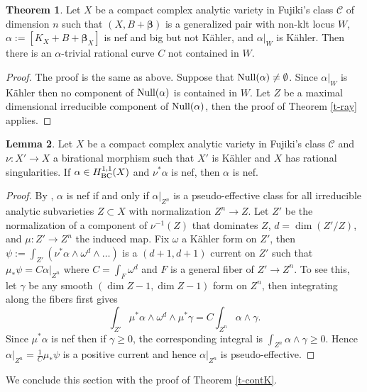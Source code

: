 \documentclass[11pt]{amsart}
\numberwithin{equation}{section}
\def\bbeta{\boldsymbol{\beta}}
\def\dim{\operatorname{dim}}
\newcommand\Q{{\mathbb{Q}}}
\theoremstyle{definition}
\theoremstyle{definition}
\newtheorem{theorem}{Theorem}[section]
\newtheorem{lemma}[theorem]{Lemma}
\newtheorem{corollary}[theorem]{Corollary}
\theoremstyle{definition}
\begin{document}
\begin{theorem} 
\label{t-raynklt} 
Let $X$ be a compact complex analytic variety in Fujiki's class $\mathcal C$ of dimension $n$ such that $(X,B+\bbeta)$ is a generalized pair with non-klt locus $W$, $\alpha:=[K_X+B+\bbeta _X]$ is nef and big but not K\"ahler, and $\alpha |_{W}$ is K\"ahler. Then there is an $\alpha $-trivial  rational curve $C$ not contained in $W$.
\end{theorem}
\begin{proof} The proof is the same as above. Suppose that ${\rm Null}(\alpha)\ne \emptyset$. Since $\alpha |_{W}$ is K\"ahler then no component of ${\rm Null}(\alpha)$ is contained in $ W$. Let $Z$ be a maximal dimensional irreducible component of ${\rm Null}(\alpha)$, then the proof of Theorem \ref{t-ray} applies. 
\end{proof}
\begin{lemma}\label{l-nefpb} Let $X$ be a  compact complex analytic variety in Fujiki's class $\mathcal C$ and $\nu :X'\to X$ a birational morphism such that $X'$ is K\"ahler and $X$ has rational singularities. If  $\alpha \in H^{1,1}_{\rm BC}(X)$ and $\nu ^*\alpha$ is nef, then $\alpha$ is nef. \end{lemma} 
\begin{proof} By \cite[Remark 2.37]{DHP24}, $\alpha$ is nef if and only if $\alpha|_{Z^n}$ is a pseudo-effective class for all irreducible analytic
subvarieties $Z \subset X$ with normalization $Z^n\to Z$.
Let $Z'$ be the normalization of a component of $\nu^{-1}(Z)$ that dominates $Z$, $d=\dim(Z'/Z)$, and $\mu:Z'\to Z^n$ the induced map. Fix $\omega$ a K\"ahler form on $Z'$, then $\psi:=\int _{Z'} (\nu ^*\alpha\wedge \omega ^d \wedge\ldots )$ is a $(d+1,d+1)$ current on $Z'$ such that
$\mu _* \psi =C \alpha |_{Z^n}$
 where $C=\int _F \omega ^d$ and $F$ is a general fiber of $Z'\to {Z^n}$. To see this, let $\gamma$ be any smooth $(\dim Z-1,\dim Z-1)$ form on ${Z^n}$, then  integrating along the fibers first gives
\[\int _{Z'} \mu ^*\alpha\wedge \omega ^d \wedge \mu ^*\gamma =C \int _{Z^n}\alpha \wedge \gamma .\]
Since  $\mu ^*\alpha$ is nef then if $\gamma\geq 0$, the corresponding integral is $\int _{Z^n}\alpha \wedge \gamma\geq 0$.
Hence $\alpha|_{Z^n}=\frac 1 C \mu _* \psi $  is a positive current and hence  $\alpha |_{Z^n}$ is pseudo-effective.

\end{proof}
We conclude this section with the proof of Theorem \ref{t-contK}.
\end{document}
